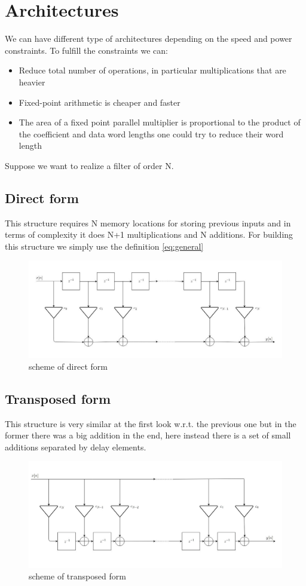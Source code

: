 \section{Architectures}
We can have different type of architectures depending on the speed and power constraints.
To fulfill the constraints we can:\\
\begin{itemize}
    \item Reduce total number of operations, in particular multiplications that are heavier
    \item Fixed-point arithmetic is cheaper and faster
    \item The area of a fixed point parallel multiplier is proportional to the product of the coefficient and data word lengths one could try to reduce their word length
\end{itemize}
Suppose we want to realize a filter of order N.
\subsection{Direct form}
This structure requires N memory locations for storing previous inputs and in terms of complexity it does N+1 multiplications and  N additions.  For building this structure we simply use the definition \ref{eq:general}
\begin{figure}[H]
    \centering
    \includegraphics[scale=0.45]{images/direct.jpeg}    
    \caption{scheme of direct form}
    \label{fig:my_label}
\end{figure}
\subsection{Transposed form}
This structure is very similar at the first look w.r.t. the previous one but in the former there was a big addition in the end, here instead there is a set of small additions separated by delay elements.
\begin{figure}[H]
    \centering
    \includegraphics[scale=0.45]{images/transposed.jpg}    
    \caption{scheme of transposed form}
    \label{fig:my_label}
\end{figure}

